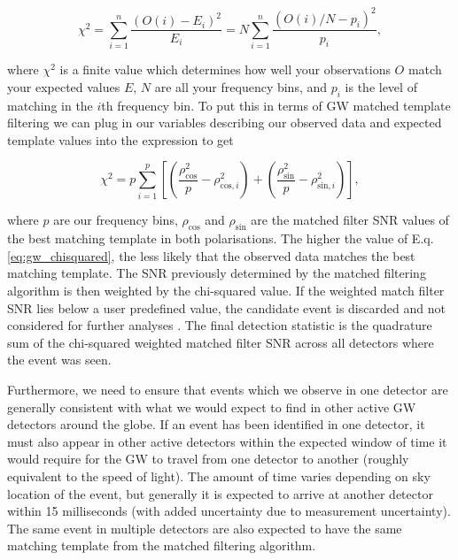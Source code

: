 \begin{equation}
    \chi^2 = \sum_{i=1}^{n} \frac{(O(i) - E_i)^2}{E_i} 
    = N \sum_{i=1}^{n} \frac{(O(i)/N - p_i)^2}{p_i},
\end{equation}

%
%
where $\chi^2$ is a finite value which determines how well your observations $O$ match your expected values $E$, $N$ are all your frequency bins, and $p_i$ is the level of matching in the $i$th frequency bin. To put this in terms of \ac{GW} matched template filtering we can plug in our variables describing our observed data and expected template values into the expression to get 

\begin{equation} \label{eq:gw_chisquared}
    \chi^2 = p \sum_{i=1}^p \left[  \left( \frac{\rho_{\mathrm{cos}}^2 }{p} - \rho_{\mathrm{cos}, i}^2 \right) 
    + \left( \frac{\rho_{\mathrm{sin}}^2 }{p} - \rho_{\mathrm{sin}, i}^2 \right) \right],
\end{equation}

where $p$ are our frequency bins, $\rho_{\mathrm{cos}}$ and $\rho_{\mathrm{sin}}$ are the matched filter \ac{SNR} values of the best matching template in both polarisations. The higher the value of E.q. \ref{eq:gw_chisquared}, the less likely that the observed data matches the best matching template. The \ac{SNR} previously determined by the matched filtering algorithm is then weighted by the chi-squared value. If the weighted match filter \ac{SNR} lies below a user predefined value, the candidate event is discarded and not considered for further analyses \cite{0264-9381-33-21-215004}. The final detection statistic is the quadrature sum of the chi-squared weighted matched filter \ac{SNR} across all detectors where the event was seen.

%
%
Furthermore, we need to ensure that events which we observe in one detector are generally consistent with what we would expect to find in other active \ac{GW} detectors around the globe. If an event has been identified in one detector, it must also appear in other active detectors within the expected window of time it would require for the \ac{GW} to travel from one detector to another (roughly equivalent to the speed of light). The amount of time varies depending on sky location of the event, but generally it is expected to arrive at another detector within 15 milliseconds (with added uncertainty due to measurement uncertainty). The same event in multiple detectors are also expected to have the same matching template from the matched filtering algorithm.

